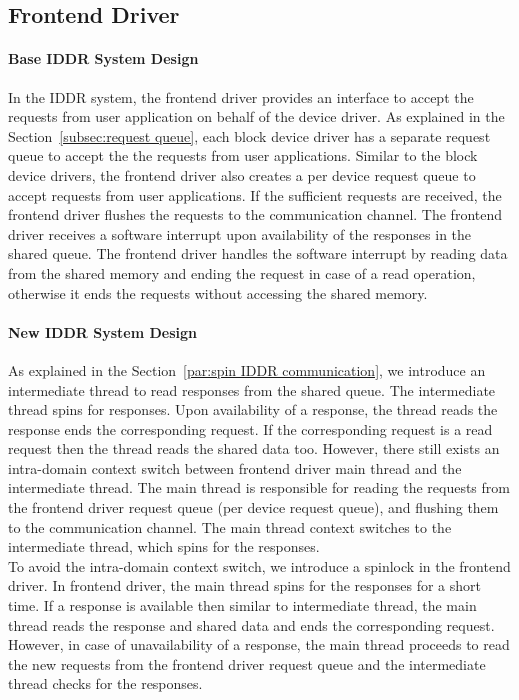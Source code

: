\subsection{Frontend Driver}
\paragraph{Base IDDR System Design}
In the IDDR system, the frontend driver provides an interface to accept the requests from user application on behalf of the device driver. As explained in the Section~\ref{subsec:request queue}, each block device driver has a separate request queue to accept the the requests from user applications. Similar to the block device drivers, the frontend driver also creates a per device request queue to accept requests from user applications. If the sufficient requests are received, the frontend driver flushes the requests to the communication channel. The frontend driver receives a software interrupt upon availability of the responses in the shared queue. The frontend driver handles the software interrupt by reading data from the shared memory and ending the request in case of a read operation, otherwise it ends the requests without accessing the shared memory.

\paragraph{New IDDR System Design}
As explained in the Section~\ref{par:spin IDDR communication}, we introduce an intermediate thread to read responses from the shared queue. The intermediate thread spins for responses. Upon availability of a response, the thread reads the response ends the corresponding request. If the corresponding request is a read request then the thread reads the shared data too. However, there still exists an intra-domain context switch between frontend driver main thread and the intermediate thread. The main thread is responsible for reading the requests from the frontend driver request queue (per device request queue), and flushing them to the communication channel. The main thread context switches to the intermediate thread, which spins for the responses. 
\\[3mm]
To avoid the intra-domain context switch, we introduce a spinlock in the frontend driver. In frontend driver, the main thread spins for the responses for a short time. If a response is available then similar to intermediate thread, the main thread reads the response and shared data and ends the corresponding request. However, in case of unavailability of a response, the main thread proceeds to read the new requests from the frontend driver request queue and the intermediate thread checks for the responses.  

